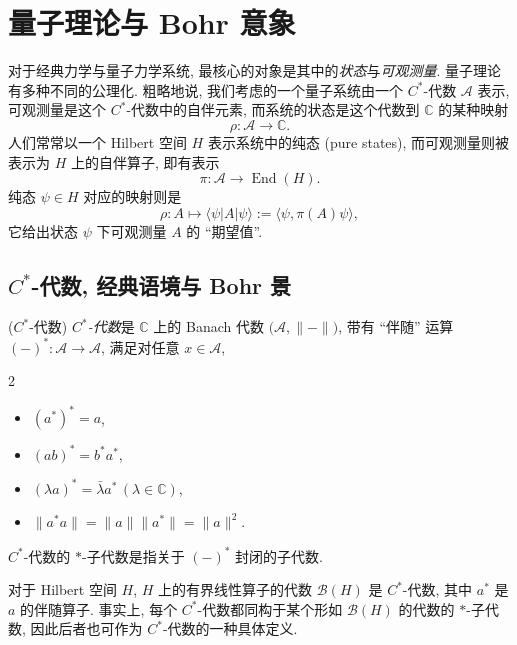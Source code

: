 \section{量子理论与 Bohr 意象}


对于经典力学与量子力学系统, 最核心的对象是其中的\emph{状态}与\emph{可观测量}.
量子理论有多种不同的公理化. 粗略地说, 我们考虑的一个量子系统由一个 $C^*$-代数 $\mathcal A$ 表示, 可观测量是这个 $C^*$-代数中的自伴元素, 而系统的状态是这个代数到 $\mathbb{C}$ 的某种映射 $$\rho\colon \mathcal A \to \mathbb{C}.$$ 人们常常以一个 Hilbert 空间 $H$ 表示系统中的纯态 (pure states), 而可观测量则被表示为 $H$ 上的自伴算子, 即有表示 $$\pi\colon \mathcal A \to \operatorname{End}(H).$$ 纯态 $\psi\in H$ 对应的映射则是
$$
\rho\colon A\mapsto \langle\psi | A | \psi \rangle := \langle\psi,\pi(A)\psi\rangle,
$$
它给出状态 $\psi$ 下可观测量 $A$ 的 ``期望值''.

\subsection{$C^*$-代数, 经典语境与 Bohr 景}

\begin{definition}
    {($C^*$-代数)}
    \emph{$C^*$-代数}是 $\mathbb{C}$ 上的 Banach 代数 $\big(\mathcal A,\|{-}\|\big)$,
    带有 ``伴随'' 运算 $(-)^*\colon \mathcal A \to \mathcal A$,
    满足对任意 $x\in \mathcal A$,
    \begin{multicols}
    	{2}
    	\begin{itemize}
    		\item $(a^*)^*=a$,
    		\item $(ab)^*=b^*a^*$,
    		\item $(\lambda a)^*=\bar\lambda a^*\,(\lambda\in\mathbb{C})$,
    		\item $\|a^* a\|=\|a\|\|a^*\|=\|a\|^2$.
    	\end{itemize}
    \end{multicols}
    $C^*$-代数的 $*$-子代数是指关于 $(-)^*$ 封闭的子代数.
\end{definition}

\begin{example}
    {}
    对于 Hilbert 空间 $H$, $H$ 上的有界线性算子的代数 $\mathcal B(H)$ 是 $C^*$-代数, 其中 $a^*$ 是 $a$ 的伴随算子. 事实上, 每个 $C^*$-代数都同构于某个形如 $\mathcal B(H)$ 的代数的 $*$-子代数, 因此后者也可作为 $C^*$-代数的一种具体定义.
\end{example}

